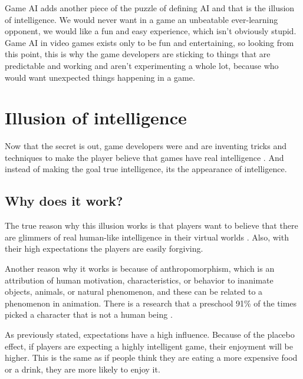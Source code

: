 \documentclass[a4paper, 12pt]{book}
\begin{document}
Game AI adds another piece of the puzzle of defining AI and that is the illusion of intelligence. We would never want in a game an unbeatable ever-learning opponent, we would like a fun and easy experience, which isn't obviously stupid. Game AI in video games exists only to be fun and entertaining, so looking from this point, this is why the game developers are sticking to things that are predictable and working and aren't experimenting a whole lot, because who would want unexpected things happening in a game.

\section{Illusion of intelligence}
Now that the secret is out, game developers were and are inventing tricks and techniques to make the player believe that games have real intelligence \cite{IllusionOfIntelligece}. And instead of making the goal true intelligence, its the appearance of intelligence.

\subsection{Why does it work?}
The true reason why this illusion works is that players want to believe that there are glimmers of real human-like intelligence in their virtual worlds \cite{IllusionOfIntelligece}. Also, with their high expectations the players are easily forgiving.

Another reason why it works is because of anthropomorphism, which is an attribution of human motivation, characteristics, or behavior to inanimate objects, animals, or natural phenomenon, and these can be related to a phenomenon in animation. There is a research that a preschool 91\% of the times picked a character that is not a human being 
 \cite{AnthropomorphicCharacters}.

As previously stated, expectations have a high influence. Because of the placebo effect, if players are expecting a highly intelligent game, their enjoyment will be higher. This is the same as if people think they are eating a more expensive food or a drink, they are more likely to enjoy it.
\end{document}
